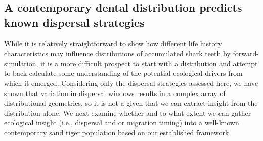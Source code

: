 \documentclass[]{rsos}%
\begin{document}



\subsection{A contemporary dental distribution predicts known dispersal strategies}


While it is relatively straightforward to show how different life history characteristics may influence distributions of accumulated shark teeth by forward-simulation, it is a more difficult prospect to start with a distribution and attempt to back-calculate some understanding of the potential ecological drivers from which it emerged.
Considering only the dispersal strategies assessed here, we have shown that variation in dispersal windows results in a complex array of distributional geometries, so it is not a given that we can extract insight from the distribution alone.
We next examine whether and to what extent we can gather ecological insight (i.e., dispersal and or migration timing) into a well-known contemporary sand tiger population based on our established framework.
\end{document}
